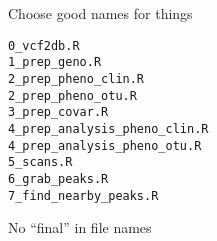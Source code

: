 \documentclass[aspectratio=169,12pt,t]{beamer}
\begin{document}
\begin{frame}[fragile,c]{Choose good names for things}

\begin{center}
\begin{minipage}[c]{10.3cm}
\begin{semiverbatim}
\lstset{basicstyle=\normalsize}
\begin{lstlisting}[linewidth=10.3cm]
0_vcf2db.R
1_prep_geno.R
2_prep_pheno_clin.R
2_prep_pheno_otu.R
3_prep_covar.R
4_prep_analysis_pheno_clin.R
4_prep_analysis_pheno_otu.R
5_scans.R
6_grab_peaks.R
7_find_nearby_peaks.R
\end{lstlisting}
\end{semiverbatim}
\end{minipage}
\end{center}

\note{}

\end{frame}



\begin{frame}[c]{No ``{\hilit final}'' in file names}

\vspace*{3mm}

\centering



\end{frame}
\end{document}
